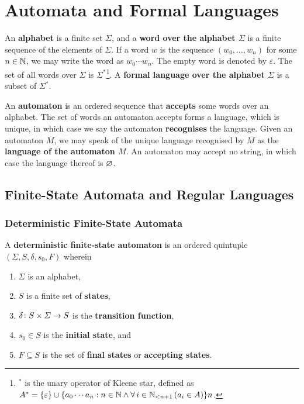 


\usepackage{tikz}
\usetikzlibrary{automata,decorations.markings}
\newcommand*{\pt}{5mm}
\newcommand*{\lemautorefname}{Lemma}


\section{Automata and Formal Languages}

An {\bf alphabet} is a finite set \(\varSigma\), and a {\bf word over the
alphabet \(\varSigma\)} is a finite sequence of the elements of \(\varSigma\).
If a word \(w\) is the sequence \((w_0, \ldots, w_n)\) for some \(n \in
\setnat\), we may write the word as \(w_0 \cdots w_n\). The empty word is
denoted by \(\varepsilon\). The set of all words over \(\varSigma\) is
\(\varSigma^*\)\footnote{\(^*\) is the unary operator of Kleene star, defined as
\(A^* = \set{\varepsilon} \cup \set{a_0 \cdots a_n : n \in \setnat \land \forall
\, i \in \Nln[n + 1] \, (a_i \in A)}n\).}. A {\bf formal language over the
alphabet \(\varSigma\)} is a subset of \(\varSigma^*\).

An {\bf automaton} is an ordered sequence that {\bf accepts} some words over an
alphabet. The set of words an automaton accepts forms a language, which is
unique, in which case we say the automaton {\bf recognises} the language. Given
an automaton \(M\), we may speak of the unique language recognised by \(M\) as
the {\bf language of the automaton \(M\)}. An automaton may accept no string, in
which case the language thereof is \(\nset\).

\subsection{Finite-State Automata and Regular Languages}

\subsubsection{Deterministic Finite-State Automata}

\Bdf
    A {\bf deterministic finite-state automaton} is an ordered quintuple
    \((\varSigma, S, \delta, s_0, F)\) wherein
    \begin{enumerate}
        \item \(\varSigma\) is an alphabet,
        \item \(S\) is a finite set of {\bf states},
        \item \(\map{\delta}{S \times \varSigma}{S}\) is the {\bf transition
        function},
        \item \(s_0 \in S\) is the {\bf initial state}, and
        \item \(F \subseteq S\) is the set of {\bf final states} or {\bf
        accepting states}.
    \end{enumerate}
\Edf

